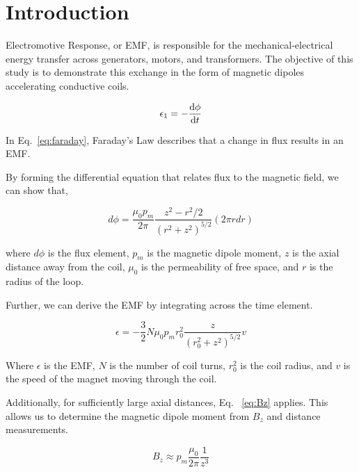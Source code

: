 \section{Introduction}



Electromotive Response, or EMF, is responsible for the mechanical-electrical energy transfer across generators,
motors, and transformers.
The objective of this study is to demonstrate this exchange in the form of magnetic dipoles accelerating
conductive coils.

\begin{equation}\label{eq:faraday}
    \epsilon_1 = -\frac{\mathop{}\!\mathrm{d} \phi}{\mathop{}\!\mathrm{d} t}
\end{equation}

In Eq.~\eqref{eq:faraday}, Faraday's Law describes that a change in flux results in an EMF\@.

By forming the differential equation that relates flux to the magnetic field, we can show that,

\begin{equation}\label{eq:flux}
    d \phi = \frac{\mu_0 p_m}{2 \pi} \frac{z^2 - r^2 / 2}{(r^2 + z^2)^{5/2}} (2 \pi r dr)
\end{equation}

where $d \phi$ is the flux element, $p_m$ is the magnetic dipole moment, $z$ is the axial distance away from the
coil, $\mu_0$ is the permeability of free space, and $r$ is the radius of the loop.

Further, we can derive the EMF by integrating across the time element.

\begin{equation}\label{eq:emf}
    \epsilon = -\frac{3}{2} N \mu_0 p_m r_0^2 \frac{z}{(r_0^2 + z^2)^{5/2}}v
\end{equation}

Where $\epsilon$ is the EMF, $N$ is the number of coil turns, $r_0^2$ is the coil radius, and $v$ is the speed of
the magnet moving through the coil.

Additionally, for sufficiently large axial distances, Eq. ~\eqref{eq:Bz} applies.
This allows us to determine the magnetic dipole moment from $B_z$ and distance measurements.

\begin{equation}\label{eq:Bz}
    B_z \approx p_m \frac{\mu_0}{2 \pi} \frac{1}{z^3}
\end{equation}


